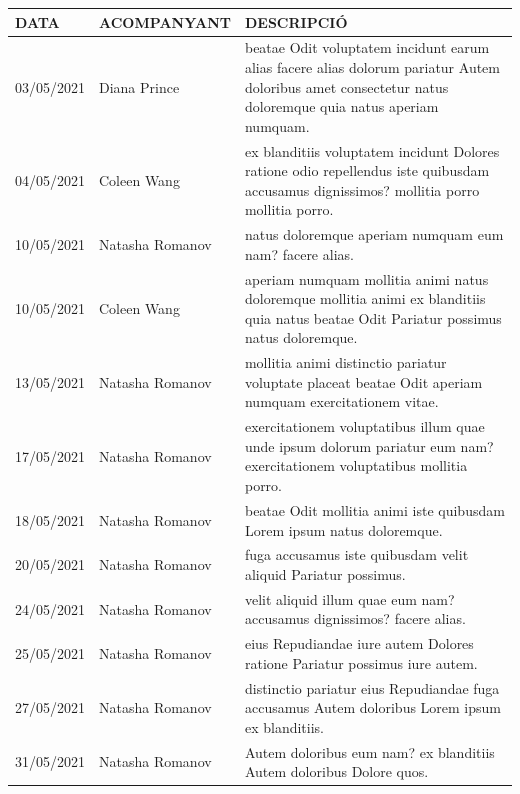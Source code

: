 \documentclass[a4paper,12pt]{elsarticle}  %
\begin{document}
	\begin{longtable}{p{}lp{}}
		

		
		\hline
		\textbf{DATA} & \textbf{ACOMPANYANT} & \textbf{DESCRIPCIÓ}\\
		\hline
			 03/05/2021 & Diana Prince & beatae Odit voluptatem incidunt earum alias facere alias dolorum pariatur Autem doloribus amet consectetur natus doloremque quia natus aperiam numquam. \\ 
			 04/05/2021 & Coleen Wang & ex blanditiis voluptatem incidunt Dolores ratione odio repellendus iste quibusdam accusamus dignissimos? mollitia porro mollitia porro. \\ 
			 10/05/2021 & Natasha Romanov & natus doloremque aperiam numquam eum nam? facere alias. \\ 
			 10/05/2021 & Coleen Wang & aperiam numquam mollitia animi natus doloremque mollitia animi ex blanditiis quia natus beatae Odit Pariatur possimus natus doloremque. \\ 
			 13/05/2021 & Natasha Romanov & mollitia animi distinctio pariatur voluptate placeat beatae Odit aperiam numquam exercitationem vitae. \\ 
			 17/05/2021 & Natasha Romanov & exercitationem voluptatibus illum quae unde ipsum dolorum pariatur eum nam? exercitationem voluptatibus mollitia porro. \\ 
			 18/05/2021 & Natasha Romanov & beatae Odit mollitia animi iste quibusdam Lorem ipsum natus doloremque. \\ 
			 20/05/2021 & Natasha Romanov & fuga accusamus iste quibusdam velit aliquid Pariatur possimus. \\ 
			 24/05/2021 & Natasha Romanov & velit aliquid illum quae eum nam? accusamus dignissimos? facere alias. \\ 
			 25/05/2021 & Natasha Romanov & eius Repudiandae iure autem Dolores ratione Pariatur possimus iure autem. \\ 
			 27/05/2021 & Natasha Romanov & distinctio pariatur eius Repudiandae fuga accusamus Autem doloribus Lorem ipsum ex blanditiis. \\ 
			 31/05/2021 & Natasha Romanov & Autem doloribus eum nam? ex blanditiis Autem doloribus Dolore quos. \\ 
		
	\end{longtable}
\end{document}
